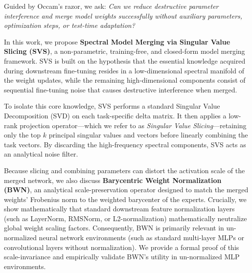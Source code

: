 Guided by Occam's razor, we ask: \emph{Can we reduce destructive parameter interference and merge model weights successfully without auxiliary parameters, optimization steps, or test-time adaptation?}

In this work, we propose \textbf{Spectral Model Merging via Singular Value Slicing (SVS)}, a non-parametric, training-free, and closed-form model merging framework. SVS is built on the hypothesis that the essential knowledge acquired during downstream fine-tuning resides in a low-dimensional spectral manifold of the weight updates, while the remaining high-dimensional components consist of sequential fine-tuning noise that causes destructive interference when merged.

To isolate this core knowledge, SVS performs a standard Singular Value Decomposition (SVD) on each task-specific delta matrix. It then applies a low-rank projection operator—which we refer to as \emph{Singular Value Slicing}—retaining only the top $k$ principal singular values and vectors before linearly combining the task vectors. By discarding the high-frequency spectral components, SVS acts as an analytical noise filter. 

Because slicing and combining parameters can distort the activation scale of the merged network, we also discuss \textbf{Barycentric Weight Normalization (BWN)}, an analytical scale-preservation operator designed to match the merged weights' Frobenius norm to the weighted barycenter of the experts. Crucially, we show mathematically that standard downstream feature normalization layers (such as LayerNorm, RMSNorm, or L2-normalization) mathematically neutralize global weight scaling factors. Consequently, BWN is primarily relevant in un-normalized neural network environments (such as standard multi-layer MLPs or convolutional layers without normalization). We provide a formal proof of this scale-invariance and empirically validate BWN's utility in un-normalized MLP environments.

